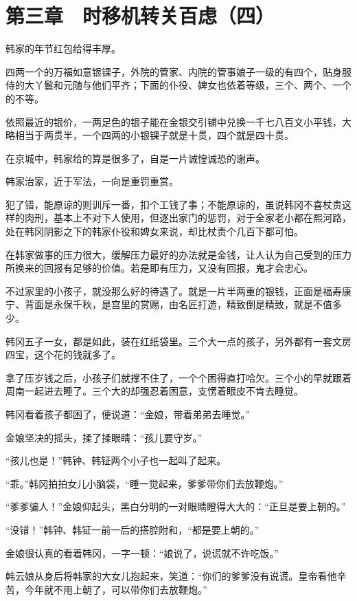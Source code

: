 \section{第三章　时移机转关百虑（四）}

韩家的年节红包给得丰厚。

四两一个的万福如意银锞子，外院的管家、内院的管事娘子一级的有四个，贴身服侍的大丫鬟和元随与他们平齐；下面的仆役、婢女也依着等级，三个、两个、一个的不等。

依照最近的银价，一两足色的银子能在金银交引铺中兑换一千七八百文小平钱，大略相当于两贯半，一个四两的小银锞子就是十贯，四个就是四十贯。

在京城中，韩家给的算是很多了，自是一片诚惶诚恐的谢声。

韩家治家，近于军法，一向是重罚重赏。

犯了错，能原谅的则训斥一番，扣个工钱了事；不能原谅的，虽说韩冈不喜杖责这样的肉刑，基本上不对下人使用，但逐出家门的惩罚，对于全家老小都在熙河路，处在韩冈阴影之下的韩家仆役和婢女来说，却比杖责个几百下都可怕。

在韩家做事的压力很大，缓解压力最好的办法就是金钱，让人认为自己受到的压力所换来的回报有足够的价值。若是即有压力，又没有回报，鬼才会忠心。

不过家里的小孩子，就没那么好的待遇了。就是一片半两重的银钱，正面是福寿康宁、背面是永保千秋，是宫里的赏赐，由名匠打造，精致倒是精致，就是不值多少。

韩冈五子一女，都是如此，装在红纸袋里。三个大一点的孩子，另外都有一套文房四宝，这个花的钱就多了。

拿了压岁钱之后，小孩子们就撑不住了，一个个困得直打哈欠。三个小的早就跟着周南一起进去睡了。三个大的却强忍着困意，支愣着眼皮不肯去睡觉。

韩冈看着孩子都困了，便说道：“金娘，带着弟弟去睡觉。”

金娘坚决的摇头，揉了揉眼睛：“孩儿要守岁。”

“孩儿也是！”韩钟、韩钲两个小子也一起叫了起来。

“乖。”韩冈拍拍女儿小脑袋，“睡一觉起来，爹爹带你们去放鞭炮。”

“爹爹骗人！”金娘仰起头，黑白分明的一对眼睛瞪得大大的：“正旦是要上朝的。”

“没错！”韩钟、韩钲一前一后的搭腔附和，“都是要上朝的。”

金娘很认真的看着韩冈，一字一顿：“娘说了，说谎就不许吃饭。”

韩云娘从身后将韩家的大女儿抱起来，笑道：“你们的爹爹没有说谎。皇帝看他辛苦，今年就不用上朝了，可以带你们去放鞭炮。”

